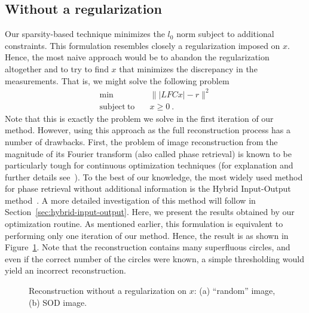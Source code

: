\subsection{Without a regularization}
\label{sec:with-regul}
Our sparsity-based technique  minimizes the $l_{0}$ norm
subject to additional constraints. This formulation resembles closely
a regularization imposed on $x$. Hence, the most naive approach would
be to abandon the regularization altogether and to try to find $x$ that
minimizes the discrepancy in the measurements. That is, we might
solve the following problem
\begin{equation}
  \label{eq:sparse-4}
    \begin{split}
      \min &\quad \||LFCx| - r\|^{2} \\
      \mathrm{subject\ to} &\quad x \geq 0 \ .
    \end{split}
\end{equation}
Note that this is exactly the problem we solve in the first iteration
of our method. However, using this approach as the full reconstruction
process has a number of drawbacks. First,
the problem of image reconstruction from the magnitude of its Fourier
transform (also called phase retrieval) is known to be particularly
tough for continuous optimization techniques (for explanation and
further details see~). To the best of our
knowledge, the
most widely used method for phase retrieval without additional information
is the Hybrid Input-Output method~.  A more
detailed investigation of this method will follow in
Section~\ref{sec:hybrid-input-output}. Here, we present the results
obtained by our optimization routine. As mentioned earlier, this
formulation is equivalent to performing only one iteration of our
method. Hence, the result is as shown in
Figure~\ref{fig:rec-without-regularization}. Note that the
reconstruction contains many superfluous circles, and even if the correct
number of the circles were known, a simple thresholding would yield an
incorrect reconstruction.
\begin{figure}[H]
  \centering
  \qquad{}
  \caption[Reconstruction without a regularization on $x$]{Reconstruction without a regularization on $x$: (a)
    ``random'' image, (b) SOD image.}
  \label{fig:rec-without-regularization}
\end{figure}

